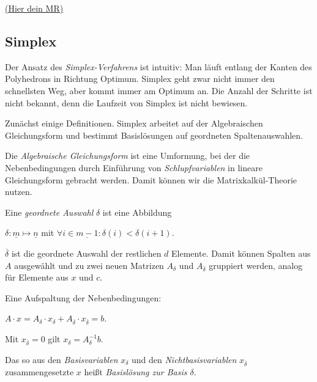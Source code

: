 \documentclass{panikzettel}
\newcommand{\mrhere}[1]{\hyperref[mrExp:#1]{\hypertarget{mr:#1}{\small\sffamily(Hier dein MR)}}}
\begin{document}
\mrhere{lp-geo}

\subsection{Simplex}

Der Ansatz des \emph{Simplex-Verfahrens} ist intuitiv: Man läuft entlang der Kanten des Polyhedrons in Richtung Optimum.
Simplex geht zwar nicht immer den schnellsten Weg, aber kommt immer am Optimum an.
Die Anzahl der Schritte ist nicht bekannt, denn die Laufzeit von Simplex ist nicht bewiesen.

Zunächst einige Definitionen.
Simplex arbeitet auf der Algebraischen Gleichungsform und bestimmt Basislösungen auf geordneten Spaltenauswahlen.

\begin{halfboxl}
Die \emph{Algebraische Gleichungsform} ist eine Umformung, bei der die Nebenbedingungen durch Einführung von \emph{Schlupfvariablen} in lineare Gleichungsform gebracht werden.
Damit können wir die Matrixkalkül-Theorie nutzen.

Eine \emph{geordnete Auswahl} $\delta$ ist eine Abbildung
\begin{tightcenter}
$\delta : \underline{m} \mapsto \underline{n}$ mit $\forall i \in \underline{m-1} : \delta(i) < \delta(i+1)$.
\end{tightcenter}
$\overline{\delta}$ ist die geordnete Auswahl der restlichen $d$ Elemente.
Damit können Spalten aus $A$ ausgewählt und zu zwei neuen Matrizen $A_\delta$ und $A_{\overline{\delta}}$ gruppiert werden, analog für Elemente aus $x$ und $c$.

Eine Aufspaltung der Nebenbedingungen:
\begin{tightcenter}
$A \cdot x = A_{\delta} \cdot x_{\delta} + A_{\overline{\delta}} \cdot x_{\overline{\delta}} = b$.
\end{tightcenter}
Mit $x_{\overline{\delta}} = 0$ gilt $x_{\delta} = A_{\delta}^{-1} b$.

Das so aus den \emph{Basisvariablen} $x_{\delta}$ und den \emph{Nichtbasisvariablen} $x_{\overline{\delta}}$ zusammengesetzte $x$ heißt \emph{Basislösung zur Basis $\delta$}.

\end{halfboxl}%
\end{document}
